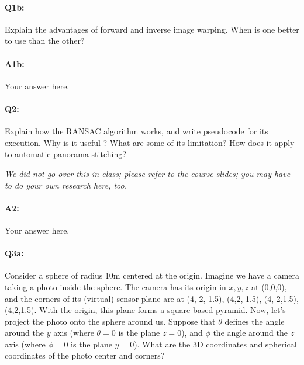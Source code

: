 \paragraph{Q1b:}
Explain the advantages of forward and inverse image warping. When is one better to use than the other? 

\paragraph{A1b:} Your answer here.



\pagebreak
\paragraph{Q2:} 
Explain how the RANSAC algorithm works, and write pseudocode for its execution. Why is it useful ? What are some of its limitation? How does it apply to automatic panorama stitching?

\emph{We did not go over this in class; please refer to the course slides; you may have to do your own research here, too.}


\paragraph{A2:} Your answer here.



\pagebreak
\paragraph{Q3a:} 
Consider a sphere of radius 10m centered at the origin. Imagine we have a camera taking a photo inside the sphere. The camera has its origin in $x,y,z$ at (0,0,0), and the corners of its (virtual) sensor plane are at (4,-2,-1.5), (4,2,-1.5), (4,-2,1.5), (4,2,1.5). With the origin, this plane forms a square-based pyramid. Now, let's project the photo onto the sphere around us. Suppose that $\theta$ defines the angle around the $y$ axis (where $\theta=0$ is the plane $z=0$), and $\phi$ the angle around the $z$ axis (where $\phi=0$ is the plane $y=0$). What are the 3D coordinates and spherical coordinates of the photo center and corners? 

